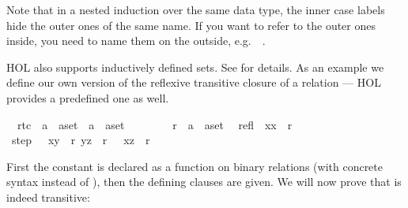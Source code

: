 \begin{isabellebody}
\begin{isamarkuptext}
Note that in a nested induction over the same data type, the inner
case labels hide the outer ones of the same name. If you want to refer
to the outer ones inside, you need to name them on the outside, e.g.\
~.%
\end{isamarkuptext}%
\isamarkuptrue%
%
\isamarkuptrue%
%
\begin{isamarkuptext}%
HOL also supports inductively defined sets. See \cite{LNCS2283}
for details. As an example we define our own version of the reflexive
transitive closure of a relation --- HOL provides a predefined one as well.%
\end{isamarkuptext}%
\isamarkuptrue%
\isamarkupfalse%
\isanewline
\ \ rtc\ {\isacharcolon}{\isacharcolon}\ {\isachardoublequoteopen}{\isacharparenleft}{\isacharprime}a\ {\isasymtimes}\ {\isacharprime}a{\isacharparenright}set\ {\isasymRightarrow}\ {\isacharparenleft}{\isacharprime}a\ {\isasymtimes}\ {\isacharprime}a{\isacharparenright}set{\isachardoublequoteclose}\ \ \ {\isacharparenleft}{\isachardoublequoteopen}{\isacharunderscore}{\isacharasterisk}{\isachardoublequoteclose}\ {\isacharbrackleft}{}{}{}{}{\isacharbrackright}\ {}{}{}{\isacharparenright}\isanewline
\ \ \isakeyword{for}\ r\ {\isacharcolon}{\isacharcolon}\ {\isachardoublequoteopen}{\isacharparenleft}{\isacharprime}a\ {\isasymtimes}\ {\isacharprime}a{\isacharparenright}set{\isachardoublequoteclose}\isanewline
\isakeyword{where}\isanewline
\ \ refl{\isacharcolon}\ \ {\isachardoublequoteopen}{\isacharparenleft}x{\isacharcomma}x{\isacharparenright}\ {\isasymin}\ r{\isacharasterisk}{\isachardoublequoteclose}\isanewline
{\isacharbar}\ step{\isacharcolon}\ \ {\isachardoublequoteopen}{\isasymlbrakk}\ {\isacharparenleft}x{\isacharcomma}y{\isacharparenright}\ {\isasymin}\ r{\isacharsemicolon}\ {\isacharparenleft}y{\isacharcomma}z{\isacharparenright}\ {\isasymin}\ r{\isacharasterisk}\ {\isasymrbrakk}\ {\isasymLongrightarrow}\ {\isacharparenleft}x{\isacharcomma}z{\isacharparenright}\ {\isasymin}\ r{\isacharasterisk}{\isachardoublequoteclose}%
\begin{isamarkuptext}%
\noindent
First the constant is declared as a function on binary
relations (with concrete syntax  instead of ), then the defining clauses are given. We will now prove that
\isa{r{\isacharasterisk}} is indeed transitive:%
\end{isamarkuptext}%

\end{isabellebody}
